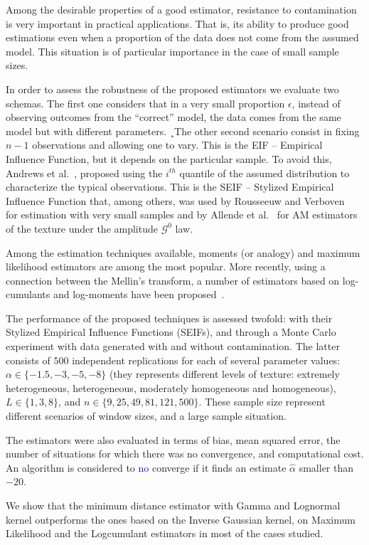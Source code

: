 \documentclass[a4paper]{article} %
\begin{document}
Among the desirable properties of a good estimator, resistance to contamination is very important in practical applications. 
That is, its ability to produce good estimations even when a proportion of the data does not come from the assumed model. 
This situation is of particular importance in the case of small sample sizes.

In order to assess the robustness of the proposed estimators we evaluate two schemas. 
The first one considers that in a very small proportion $\epsilon$, instead of observing outcomes from the ``correct'' model, the data comes from the same model but with different parameters.
¸The other second scenario consist in fixing $n-1$ observations and allowing one to vary. 
This is the EIF -- Empirical Influence Function, but it depends on the particular sample.
To avoid this, Andrews et al.~\cite{Andrews1972}, proposed using the $i^{th}$ quantile of the assumed distribution to characterize the typical observations.
This is the SEIF -- Stylized Empirical Influence Function that, among others, was used by Rousseeuw and Verboven~\cite{RousseeuwCSDA} for estimation with very small samples and by Allende et al.~\cite{AllendeFreryetal:JSCS:05} for AM estimators of the texture under the amplitude $\mathcal G^0$ law.

Among the estimation techniques available, moments (or analogy) and maximum likelihood estimators are among the most popular.  
More recently, using a connection between the Mellin's transform, a number of estimators based on log-cumulants  and log-moments have been proposed~\cite{MellinAnalysisPolSAR,BujorTrouveValetNicolas2004,khan2014}.

The performance of the proposed techniques is assessed twofold: with their Stylized Empirical Influence Functions (SEIFs), and through a Monte Carlo experiment with data generated with and without contamination. 
The latter consists of $500$ independent replications for each of several parameter values: 
$\alpha\in\{-1.5, -3, -5, -8\}$ (they represents different levels of texture: extremely heterogeneous, heterogeneous, moderately homogeneous and homogeneous), 
$L\in\{1,3,8\}$, and 
$n\in\{9, 25,49, 81,121,500\}$. 
These sample size represent different scenarios of window sizes, and a large sample situation.

The estimators were also evaluated in terms of bias, mean squared error, the number of situations for which there was no convergence, and computational cost. 
An algorithm is considered to \textcolor{blue}{no} converge if it finds an estimate $\widehat{\alpha}$ smaller than $-20$.

We show that the minimum distance estimator with Gamma and Lognormal kernel outperforms the ones based on the Inverse Gaussian kernel, on Maximum Likelihood and the Logcumulant estimators in most of the cases studied.



\end{document}
